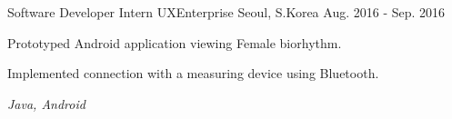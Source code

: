 \begin{cventries}
  \cventry
    {Software Developer Intern} %
    {UXEnterprise} %
    {Seoul, S.Korea} %
    {Aug. 2016 - Sep. 2016} %
    {
      \begin{cvitems} %
        \item {Prototyped Android application viewing Female biorhythm.}
        \item {Implemented connection with a measuring device using Bluetooth.}
        \item \textit{Java, Android}
      \end{cvitems}
    }

\end{cventries}
